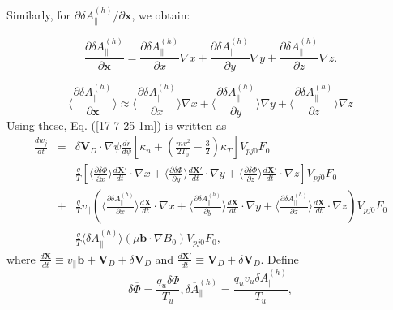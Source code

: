\documentclass{article}
\begin{document}
Similarly, for $\partial \delta A_{\parallel}^{(h)} / \partial \mathbf{x}$, we
obtain:


\begin{equation}
  \frac{\partial \delta A_{\parallel}^{(h)}}{\partial \mathbf{x}} =
  \frac{\partial \delta A_{\parallel}^{(h)}}{\partial x} \nabla x +
  \frac{\partial \delta A_{\parallel}^{(h)}}{\partial y} \nabla y +
  \frac{\partial \delta A_{\parallel}^{(h)}}{\partial z} \nabla z.
\end{equation}

\begin{equation}
  \langle \frac{\partial \delta A_{\parallel}^{(h)}}{\partial \mathbf{x}}
  \rangle \approx \langle \frac{\partial \delta A_{\parallel}^{(h)}}{\partial
  x} \rangle \nabla x + \langle \frac{\partial \delta
  A_{\parallel}^{(h)}}{\partial y} \rangle \nabla y + \langle \frac{\partial
  \delta A_{\parallel}^{(h)}}{\partial z} \rangle \nabla z
\end{equation}
Using these, Eq. (\ref{17-7-25-1m}) is written as
\begin{eqnarray}
  \frac{d w_j}{d t} & = & \delta \mathbf{V}_D \cdot \nabla \psi \frac{d r}{d
  \psi} \left[ \kappa_n + \left( \frac{m v^2}{2 T_0} - \frac{3}{2} \right)
  \kappa_T \right] V_{p j 0} F_0 \nonumber\\
  & - & \frac{q}{T} \left[ \langle \frac{\partial \delta \Phi}{\partial x}
  \rangle \frac{d\mathbf{X}'}{d t} \cdot \nabla x + \langle \frac{\partial
  \delta \Phi}{\partial y} \rangle \frac{d\mathbf{X}'}{d t} \cdot \nabla y +
  \langle \frac{\partial \delta \Phi}{\partial z} \rangle
  \frac{d\mathbf{X}'}{d t} \cdot \nabla z \right] V_{p j 0} F_0 \nonumber\\
  & + & \frac{q}{T} v_{\parallel} \left( \langle \frac{\partial \delta
  A_{\parallel}^{(h)}}{\partial x} \rangle \frac{d\mathbf{X}}{d t} \cdot
  \nabla x + \langle \frac{\partial \delta A_{\parallel}^{(h)}}{\partial y}
  \rangle \frac{d\mathbf{X}}{d t} \cdot \nabla y + \langle \frac{\partial
  \delta A_{\parallel}^{(h)}}{\partial z} \rangle \frac{d\mathbf{X}}{d t}
  \cdot \nabla z \right) V_{p j 0} F_0 \nonumber\\
  & - & \frac{q}{T} \langle \delta A_{\parallel}^{(h)} \rangle (\mu
  \mathbf{b} \cdot \nabla B_0) V_{p j 0} F_0, 
\end{eqnarray}
where $\frac{d\mathbf{X}}{d t} \equiv v_{\parallel} \mathbf{b}+ \mathbf{V}_D +
\delta \mathbf{V}_D$ and $\frac{d\mathbf{X}'}{d t} \equiv \mathbf{V}_D +
\delta \mathbf{V}_D$. Define
\begin{equation}
  \delta \overline{\Phi} = \frac{q_u \delta \Phi}{T_u}, \delta
  \overline{A}_{\parallel}^{(h)} = \frac{q_u v_u \delta
  A_{\parallel}^{(h)}}{T_u},
\end{equation}
\end{document}

